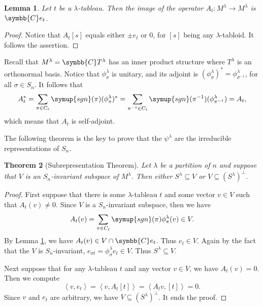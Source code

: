 \documentclass{assignment}[2019/10/15]
\newcommand{\lr}[3]{\left#1#3\right#2}
\theoremstyle{plain}
\newtheorem{theorem}{Theorem}[section]
\newtheorem{lemma}[theorem]{Lemma}
\newcommand{\BC}{\symbb{C}}
\newcommand{\sgn}{\mathop{}\!\symup{sgn}}
\begin{document}
    \begin{lemma}\label{lem: At}
        Let $t$ be a $\lambda$-tableau. Then the image of the operator $A_t\colon M^\lambda\to M^\lambda$ is $\BC e_t$.
    \end{lemma}
    \begin{proof}
        Notice that $A_t[s]$ equals either $\pm e_t$ or 0, for $[s]$ being any $\lambda$-tabloid. It follows the assertion.
    \end{proof}

    Recall that $M^\lambda = \BC T^\lambda$ has an inner product structure where $T^\lambda$ is an orthonormal basis. Notice that $\phi^\lambda_\sigma$ is unitary, and its adjoint is $(\phi^\lambda_\sigma)^*=\phi^\lambda_{\sigma^{-1}}$, for all $\sigma\in S_n$. It follows that
    \begin{equation}
        A_t^* = \sum_{\pi\in C_t}\sgn(\pi)(\phi^\lambda_\pi)^* = \sum_{\pi^{-1}\in C_t}\sgn(\pi^{-1})(\phi^\lambda_{\pi^{-1}}) = A_t,
    \end{equation}
    which means that $A_t$ is self-adjoint.

    The following theorem is the key to prove that the $\psi^\lambda$ are the irreducible representations of $S_n$.

    \begin{theorem}[Subrepresentation Theorem]\label{thm: subrepr}
        Let $\lambda$ be a partition of $n$ and suppose that $V$ is an $S_n$-invariant subspace of $M^\lambda$. Then either $S^\lambda\subseteq V$ or $V\subseteq (S^\lambda)^\perp$.
    \end{theorem}

    \begin{proof}
        First suppose that there is some $\lambda$-tableau $t$ and some vector $v\in V$ such that $A_t(v)\neq 0$. Since $V$ is a $S_n$-invariant subspace, then we have
        \begin{equation}
            A_t(v)=\sum_{\pi\in C_t}\sgn(\pi)\phi_\pi^\lambda(v)\in V.
        \end{equation}
        By Lemma \ref{lem: At}, we have $A_t(v)\in V\cap \BC e_t$. Thus $e_t\in V$. Again by the fact that the $V$ is $S_n$-invariant, $e_{\sigma t} = \phi^\lambda_\sigma e_t\in V$. Thus $S^\lambda\subseteq V$.

        Next suppose that for any $\lambda$-tableau $t$ and any vector $v\in V$, we have $A_t(v) = 0$. Then we compute
        \begin{equation}
            \lr<>{v, e_t} = \lr<>{v, A_t[t]} = \lr<>{A_tv, [t]} = 0.
        \end{equation}
        Since $v$ and $e_t$ are arbitrary, we have $V\subseteq (S^\lambda)^\perp$. It ends the proof.
    \end{proof}
\end{document}
